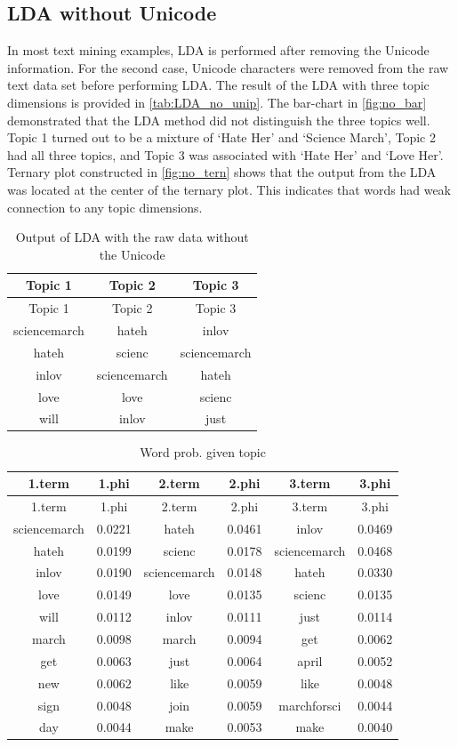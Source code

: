 \documentclass[]{article}
\begin{document}
\subsection{LDA without Unicode}\label{lda-without-unicode}

In most text mining examples, LDA is performed after removing the
Unicode information. For the second case, Unicode characters were
removed from the raw text data set before performing LDA. The result of
the LDA with three topic dimensions is provided in
\autoref{tab:LDA_no_unip}. The bar-chart in \autoref{fig:no_bar}
demonstrated that the LDA method did not distinguish the three topics
well. Topic 1 turned out to be a mixture of `Hate Her' and `Science
March', Topic 2 had all three topics, and Topic 3 was associated with
`Hate Her' and `Love Her'. Ternary plot constructed in
\autoref{fig:no_tern} shows that the output from the LDA was located at
the center of the ternary plot. This indicates that words had weak
connection to any topic dimensions.

\begin{longtable}[]{@{}ccc@{}}
\caption{\label{tab:LDA_no_uni} Output of LDA with the raw data without
the Unicode}\tabularnewline
\toprule
Topic 1 & Topic 2 & Topic 3\tabularnewline
\midrule
\endfirsthead
\toprule
Topic 1 & Topic 2 & Topic 3\tabularnewline
\midrule
\endhead
sciencemarch & hateh & inlov\tabularnewline
hateh & scienc & sciencemarch\tabularnewline
inlov & sciencemarch & hateh\tabularnewline
love & love & scienc\tabularnewline
will & inlov & just\tabularnewline
\bottomrule
\end{longtable}

\begin{longtable}[]{@{}cccccc@{}}
\caption{\label{tab:LDA_no_unip} Word prob. given topic}\tabularnewline
\toprule
1.term & 1.phi & 2.term & 2.phi & 3.term & 3.phi\tabularnewline
\midrule
\endfirsthead
\toprule
1.term & 1.phi & 2.term & 2.phi & 3.term & 3.phi\tabularnewline
\midrule
\endhead
sciencemarch & 0.0221 & hateh & 0.0461 & inlov & 0.0469\tabularnewline
hateh & 0.0199 & scienc & 0.0178 & sciencemarch & 0.0468\tabularnewline
inlov & 0.0190 & sciencemarch & 0.0148 & hateh & 0.0330\tabularnewline
love & 0.0149 & love & 0.0135 & scienc & 0.0135\tabularnewline
will & 0.0112 & inlov & 0.0111 & just & 0.0114\tabularnewline
march & 0.0098 & march & 0.0094 & get & 0.0062\tabularnewline
get & 0.0063 & just & 0.0064 & april & 0.0052\tabularnewline
new & 0.0062 & like & 0.0059 & like & 0.0048\tabularnewline
sign & 0.0048 & join & 0.0059 & marchforsci & 0.0044\tabularnewline
day & 0.0044 & make & 0.0053 & make & 0.0040\tabularnewline
\bottomrule
\end{longtable}
\end{document}
